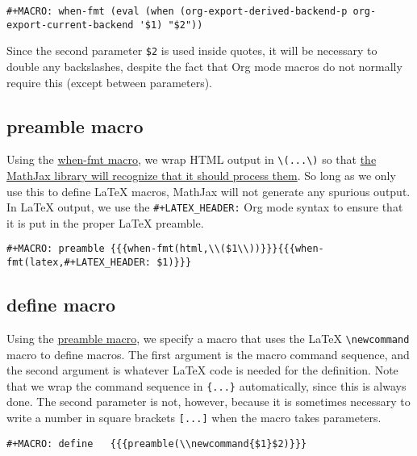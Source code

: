 \documentclass[11pt]{article}
\begin{document}
\begin{verbatim}
#+MACRO: when-fmt (eval (when (org-export-derived-backend-p org-export-current-backend '$1) "$2"))
\end{verbatim}

Since the second parameter \verb~$2~ is used inside quotes, it will be
necessary to double any backslashes, despite the fact that Org mode
macros do not normally require this (except between parameters).

\subsection*{preamble macro}
\label{sec-1-2}

Using the \hyperref[sec-1-1]{when-fmt macro}, we wrap HTML output in \verb~\(...\)~ so that \href{http://docs.mathjax.org/en/latest/tex.html#defining-tex-macros}{the
MathJax library will recognize that it should process them}.  So long
as we only use this to define \LaTeX{} macros, MathJax will not generate
any spurious output.  In \LaTeX{} output, we use the \verb~#+LATEX_HEADER:~
Org mode syntax to ensure that it is put in the proper \LaTeX{} preamble.

\begin{verbatim}
#+MACRO: preamble {{{when-fmt(html,\\($1\\))}}}{{{when-fmt(latex,#+LATEX_HEADER: $1)}}}
\end{verbatim}

\subsection*{define macro}
\label{sec-1-3}

Using the \hyperref[sec-1-2]{preamble macro}, we specify a macro that uses the \LaTeX{}
\verb~\newcommand~ macro to define macros.  The first argument is the macro
command sequence, and the second argument is whatever \LaTeX{} code is
needed for the definition.  Note that we wrap the command sequence in
\verb~{...}~ automatically, since this is always done.  The second
parameter is not, however, because it is sometimes necessary to write
a number in square brackets \verb~[...]~ when the macro takes parameters.

\begin{verbatim}
#+MACRO: define   {{{preamble(\\newcommand{$1}$2)}}}
\end{verbatim}
\end{document}
